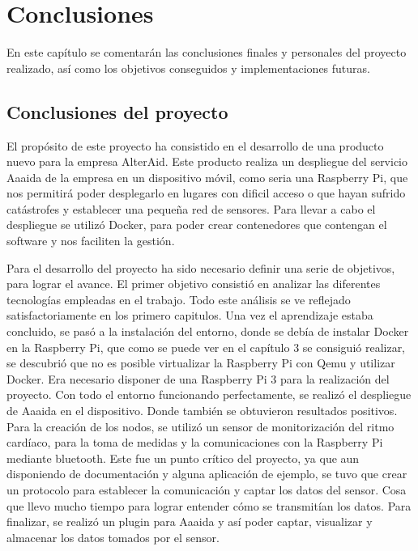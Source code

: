 \cleardoublepage
{}
\chapter*{Conclusiones}

En este capítulo se comentarán las conclusiones finales y personales del proyecto realizado, así como los objetivos conseguidos y implementaciones futuras.


\section{Conclusiones del proyecto}

El propósito de este proyecto ha consistido en el desarrollo de una producto nuevo para la empresa AlterAid. Este producto realiza un despliegue del servicio Aaaida de la empresa en un dispositivo móvil, como seria una Raspberry Pi, que nos permitirá poder desplegarlo en lugares con dificil acceso o que hayan sufrido catástrofes y establecer una pequeña red de sensores. 
Para llevar a cabo el despliegue se utilizó Docker, para poder crear contenedores que contengan el software y nos faciliten la gestión. 

Para el desarrollo del proyecto ha sido necesario definir una serie de objetivos, para lograr el avance. El primer objetivo consistió en analizar las diferentes tecnologías empleadas en el trabajo. Todo este análisis se ve reflejado satisfactoriamente en los primero capitulos. 
Una vez el aprendizaje estaba concluido, se pasó a la instalación del entorno, donde se debía de instalar Docker en la Raspberry Pi, que como se puede ver en el capítulo 3 se consiguió realizar, se descubrió que no es posible virtualizar la Raspberry Pi con Qemu y utilizar Docker. Era necesario disponer de una Raspberry Pi 3 para la realización del proyecto. Con todo el entorno funcionando perfectamente, se realizó el despliegue de Aaaida en el dispositivo. Donde también se obtuvieron resultados positivos. Para la creación de los nodos, se utilizó un sensor de monitorización del ritmo cardíaco, para la toma de medidas y la comunicaciones con la Raspberry Pi mediante bluetooth. Este fue un punto crítico del proyecto, ya que aun disponiendo de documentación y alguna aplicación de ejemplo, se tuvo que crear un protocolo para establecer la comunicación y captar los datos del sensor. Cosa que llevo mucho tiempo para lograr entender cómo se transmitían los datos. Para finalizar, se realizó un plugin para Aaaida y así poder captar, visualizar y almacenar los datos tomados por el sensor. 

